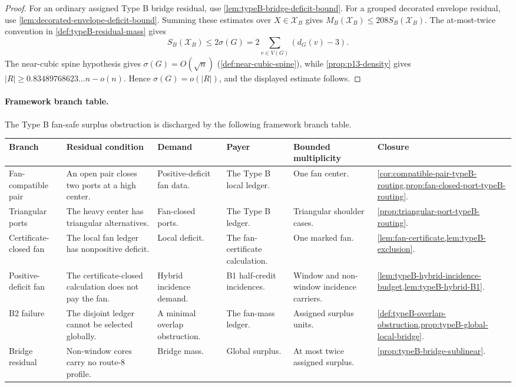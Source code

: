 \documentclass[11pt]{article}
\newcommand{\FrameworkBranchTableHeader}{%
\toprule
\textbf{Branch} & \textbf{Residual condition} & \textbf{Demand} & \textbf{Payer} & \textbf{Bounded multiplicity} & \textbf{Closure}\\
\midrule
}
\begin{document}
\begin{proof}
For an ordinary assigned Type B bridge residual, use
\cref{lem:typeB-bridge-deficit-bound}.  For a grouped decorated envelope
residual, use
\cref{lem:decorated-envelope-deficit-bound}.  Summing these estimates over
\(X\in\mathcal X_B\) gives \(M_B(\mathcal X_B)\le208S_B(\mathcal X_B)\).  The
at-most-twice convention in \cref{def:typeB-residual-mass} gives
\[
S_B(\mathcal X_B)\le
2\sigma(G)=2\sum_{v\in V(G)}(d_G(v)-3).
\]
The near-cubic spine hypothesis gives
$\sigma(G)=O(\sqrt n)$
(\cref{def:near-cubic-spine}), while
\cref{prop:p13-density} gives $|R|\ge0.83489768623\ldots n-o(n)$.  Hence
$\sigma(G)=o(|R|)$, and the displayed estimate follows.
\end{proof}

\paragraph{Framework branch table.}
The Type B fan-safe surplus obstruction is discharged by the following
framework branch table.
\begin{longtable}{L{0.13\textwidth} L{0.19\textwidth} L{0.14\textwidth} L{0.14\textwidth} L{0.17\textwidth} L{0.17\textwidth}}
\FrameworkBranchTableHeader
Fan-compatible pair
&
An open pair closes two ports at a high center.
&
Positive-deficit fan data.
&
The Type B local ledger.
&
One fan center.
&
\cref{cor:compatible-pair-typeB-routing,prop:fan-closed-port-typeB-routing}.
\\
\addlinespace
Triangular ports
&
The heavy center has triangular alternatives.
&
Fan-closed ports.
&
The Type B ledger.
&
Triangular shoulder cases.
&
\cref{prop:triangular-port-typeB-routing}.
\\
\addlinespace
Certificate-closed fan
&
The local fan ledger has nonpositive deficit.
&
Local deficit.
&
The fan-certificate calculation.
&
One marked fan.
&
\cref{lem:fan-certificate,lem:typeB-exclusion}.
\\
\addlinespace
Positive-deficit fan
&
The certificate-closed calculation does not pay the fan.
&
Hybrid incidence demand.
&
B1 half-credit incidences.
&
Window and non-window incidence carriers.
&
\cref{lem:typeB-hybrid-incidence-budget,lem:typeB-hybrid-B1}.
\\
\addlinespace
B2 failure
&
The disjoint ledger cannot be selected globally.
&
A minimal overlap obstruction.
&
The fan-mass ledger.
&
Assigned surplus units.
&
\cref{def:typeB-overlap-obstruction,prop:typeB-global-local-bridge}.
\\
\addlinespace
Bridge residual
&
Non-window cores carry no route-8 profile.
&
Bridge mass.
&
Global surplus.
&
At most twice assigned surplus.
&
\cref{prop:typeB-bridge-sublinear}.
\\
\bottomrule
\end{longtable}
\end{document}
